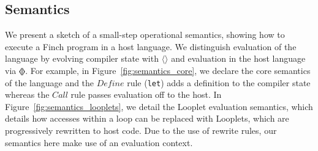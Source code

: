 



\subsection{Semantics}

We present a sketch of a small-step operational semantics, showing how to execute a Finch program in a host language.
%
We distinguish evaluation of the language by evolving compiler state with $\langle \rangle$ and evaluation in the host language via $\llangle\rrangle$.
%
For example, in Figure~\ref{fig:semantics_core}, we declare the core semantics of the language and the $Define$ rule (\texttt{let}) adds a definition to the compiler state whereas the $Call$ rule passes evaluation off to the host.
%
In Figure~\ref{fig:semantics_looplets}, we detail the Looplet evaluation semantics, which details how accesses within a loop can be replaced with Looplets, which are progressively rewritten to host code.
%
Due to the use of rewrite rules, our semantics here make use of an evaluation context.


